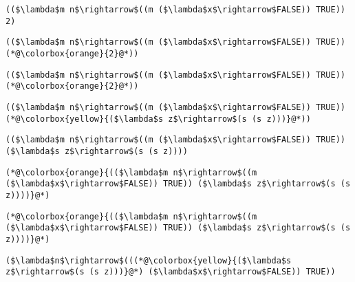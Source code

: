 \documentclass{beamer}
\begin{document}
\begin{frame}[fragile]{\CurrentSection}
\lstset{basicstyle=\ttfamily\small}\lstset{numbers=none}\lstset{language=ML}\begin{lstlisting}
(($\lambda$m n$\rightarrow$((m ($\lambda$x$\rightarrow$FALSE)) TRUE)) 2)
\end{lstlisting}
\pause\lstset{language=ML}\begin{lstlisting}
(($\lambda$m n$\rightarrow$((m ($\lambda$x$\rightarrow$FALSE)) TRUE)) (*@\colorbox{orange}{2}@*))
\end{lstlisting}

\end{frame}

\begin{frame}[fragile]{\CurrentSection}
\lstset{basicstyle=\ttfamily\small}\lstset{numbers=none}\lstset{language=ML}\begin{lstlisting}
(($\lambda$m n$\rightarrow$((m ($\lambda$x$\rightarrow$FALSE)) TRUE)) (*@\colorbox{orange}{2}@*))
\end{lstlisting}
\pause\lstset{language=ML}\begin{lstlisting}
(($\lambda$m n$\rightarrow$((m ($\lambda$x$\rightarrow$FALSE)) TRUE)) (*@\colorbox{yellow}{($\lambda$s z$\rightarrow$(s (s z)))}@*))
\end{lstlisting}

\end{frame}

\begin{frame}[fragile]{\CurrentSection}
\lstset{basicstyle=\ttfamily\small}\lstset{numbers=none}\lstset{language=ML}\begin{lstlisting}
(($\lambda$m n$\rightarrow$((m ($\lambda$x$\rightarrow$FALSE)) TRUE)) ($\lambda$s z$\rightarrow$(s (s z))))
\end{lstlisting}
\pause\lstset{language=ML}\begin{lstlisting}
(*@\colorbox{orange}{(($\lambda$m n$\rightarrow$((m ($\lambda$x$\rightarrow$FALSE)) TRUE)) ($\lambda$s z$\rightarrow$(s (s z))))}@*)
\end{lstlisting}

\end{frame}

\begin{frame}[fragile]{\CurrentSection}
\lstset{basicstyle=\ttfamily\small}\lstset{numbers=none}\lstset{language=ML}\begin{lstlisting}
(*@\colorbox{orange}{(($\lambda$m n$\rightarrow$((m ($\lambda$x$\rightarrow$FALSE)) TRUE)) ($\lambda$s z$\rightarrow$(s (s z))))}@*)
\end{lstlisting}
\pause\lstset{language=ML}\begin{lstlisting}
($\lambda$n$\rightarrow$(((*@\colorbox{yellow}{($\lambda$s z$\rightarrow$(s (s z)))}@*) ($\lambda$x$\rightarrow$FALSE)) TRUE))
\end{lstlisting}

\end{frame}
\end{document}
